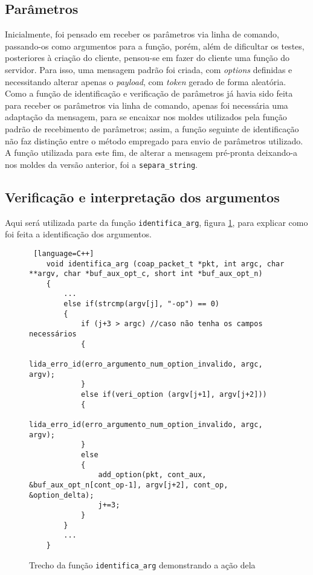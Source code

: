 \subsection{Parâmetros}
\label{subsection:parametros}

Inicialmente, foi pensado em receber os parâmetros via linha de comando, passando-os como argumentos para a função, porém, além de dificultar os testes, posteriores à criação do cliente, pensou-se em fazer do cliente uma função do servidor. Para isso, uma mensagem padrão foi criada, com \textit{options} definidas e necessitando alterar apenas o \textit{payload}, com \textit{token} gerado de forma aleatória.
Como a função de identificação e verificação de parâmetros já havia sido feita para receber os parâmetros via linha de comando, apenas foi necessária uma adaptação da mensagem, para se encaixar nos moldes utilizados pela função padrão de recebimento de parâmetros; assim, a função seguinte de identificação não faz distinção entre o método empregado para envio de parâmetros utilizado.
A função utilizada para este fim, de alterar a mensagem pré-pronta deixando-a nos moldes da versão anterior, foi a \texttt{separa\_string}.

\subsection{Verificação e interpretação dos argumentos}

Aqui será utilizada parte da função \texttt{identifica\_arg}, figura \ref{code:identifica_arg}, para explicar como foi feita a identificação dos argumentos.

\begin{figure}[!htb]
	\begin{lstlisting} [language=C++]
	void identifica_arg (coap_packet_t *pkt, int argc, char **argv, char *buf_aux_opt_c, short int *buf_aux_opt_n)
	{
		...
		else if(strcmp(argv[j], "-op") == 0)
		{
			if (j+3 > argc) //caso não tenha os campos necessários
			{
				lida_erro_id(erro_argumento_num_option_invalido, argc, argv);
			}
			else if(veri_option (argv[j+1], argv[j+2]))
			{
				lida_erro_id(erro_argumento_num_option_invalido, argc, argv);
			}
			else
			{
				add_option(pkt, cont_aux, &buf_aux_opt_n[cont_op-1], argv[j+2], cont_op, &option_delta);
				j+=3;
			}
		}
		...
	}
	\end{lstlisting}
	\caption{Trecho da função \texttt{identifica\_arg} demonstrando a ação dela}
	\label{code:identifica_arg}
\end{figure}
\hfill \break
\hfill \break
\hfill \break
\hfill \break

